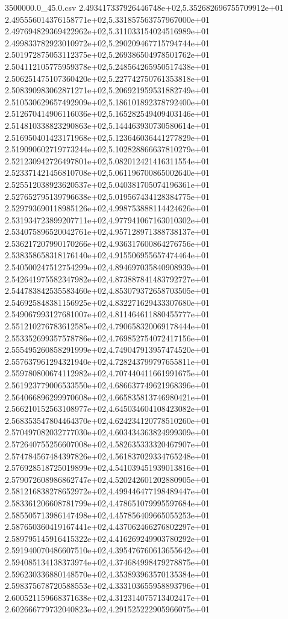 \begin{filecontents*}{3500000.0_45.0.csv}
2.493417337926446748e+02,5.352682696755709912e+01
2.495556014376158771e+02,5.331857563757967000e+01
2.497694829369422962e+02,5.311033154024516989e+01
2.499833782923010972e+02,5.290209467715794744e+01
2.501972875053112375e+02,5.269386504978501762e+01
2.504112105775959378e+02,5.248564265950517438e+01
2.506251475107360420e+02,5.227742750761353818e+01
2.508390983062871271e+02,5.206921959531882749e+01
2.510530629657492909e+02,5.186101892378792400e+01
2.512670414906116036e+02,5.165282549409403146e+01
2.514810338823290863e+02,5.144463930730580614e+01
2.516950401423171968e+02,5.123646036441277829e+01
2.519090602719773244e+02,5.102828866637810279e+01
2.521230942726497801e+02,5.082012421416311554e+01
2.523371421456810708e+02,5.061196700865002640e+01
2.525512038923620537e+02,5.040381705074196361e+01
2.527652795139796638e+02,5.019567434128384775e+01
2.529793690118985126e+02,4.998753888114424626e+01
2.531934723899207711e+02,4.977941067163010302e+01
2.534075896520042761e+02,4.957128971388738137e+01
2.536217207990170266e+02,4.936317600864276756e+01
2.538358658318176140e+02,4.915506955657474464e+01
2.540500247512754299e+02,4.894697035840908939e+01
2.542641975582347982e+02,4.873887841483792727e+01
2.544783842535583460e+02,4.853079372658703505e+01
2.546925848381156925e+02,4.832271629433307680e+01
2.549067993127681007e+02,4.811464611880455777e+01
2.551210276783612585e+02,4.790658320069178444e+01
2.553352699357578786e+02,4.769852754072417156e+01
2.555495260858291999e+02,4.749047913957474520e+01
2.557637961294321940e+02,4.728243799797655811e+01
2.559780800674112982e+02,4.707440411661991675e+01
2.561923779006533550e+02,4.686637749621968396e+01
2.564066896299970608e+02,4.665835813746980421e+01
2.566210152563108977e+02,4.645034604108423082e+01
2.568353547804464370e+02,4.624234120778510260e+01
2.570497082032777030e+02,4.603434363824999309e+01
2.572640755256607008e+02,4.582635333320467907e+01
2.574784567484397826e+02,4.561837029334765248e+01
2.576928518725019899e+02,4.541039451939013816e+01
2.579072608986862747e+02,4.520242601202880905e+01
2.581216838278652972e+02,4.499446477198489447e+01
2.583361206608781799e+02,4.478651079995597684e+01
2.585505713986147498e+02,4.457856409665055253e+01
2.587650360419167441e+02,4.437062466276802297e+01
2.589795145916415322e+02,4.416269249903780292e+01
2.591940070486607510e+02,4.395476760613655642e+01
2.594085134138373974e+02,4.374684998479278875e+01
2.596230336880148570e+02,4.353893963570135384e+01
2.598375678720588553e+02,4.333103655958893796e+01
2.600521159668371638e+02,4.312314075713402417e+01
2.602666779732040823e+02,4.291525222905966075e+01

\end{filecontents*}
